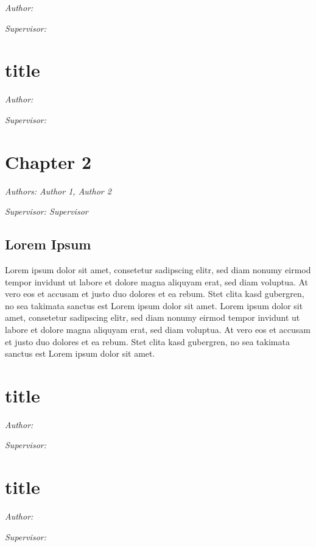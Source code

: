 \documentclass[
]{krantz}
\begin{document}
\emph{Author: }

\emph{Supervisor: }

\hypertarget{title-8}{%
\chapter{title}\label{title-8}}

\emph{Author: }

\emph{Supervisor: }

\hypertarget{chapter-2}{%
\chapter{Chapter 2}\label{chapter-2}}

\emph{Authors: Author 1, Author 2}

\emph{Supervisor: Supervisor}

\hypertarget{lorem-ipsum-2}{%
\section{Lorem Ipsum}\label{lorem-ipsum-2}}

Lorem ipsum dolor sit amet, consetetur sadipscing elitr, sed diam nonumy eirmod tempor invidunt ut labore et dolore magna aliquyam erat, sed diam voluptua. At vero eos et accusam et justo duo dolores et ea rebum. Stet clita kasd gubergren, no sea takimata sanctus est Lorem ipsum dolor sit amet. Lorem ipsum dolor sit amet, consetetur sadipscing elitr, sed diam nonumy eirmod tempor invidunt ut labore et dolore magna aliquyam erat, sed diam voluptua. At vero eos et accusam et justo duo dolores et ea rebum. Stet clita kasd gubergren, no sea takimata sanctus est Lorem ipsum dolor sit amet.

\citet{rlang}

\hypertarget{title-9}{%
\chapter{title}\label{title-9}}

\emph{Author: }

\emph{Supervisor: }

\hypertarget{title-10}{%
\chapter{title}\label{title-10}}

\emph{Author: }

\emph{Supervisor: }
\end{document}
